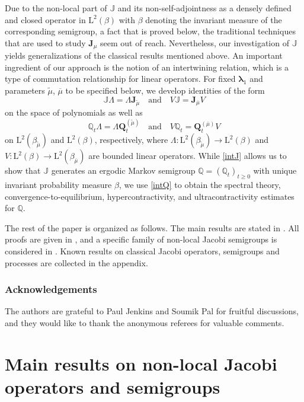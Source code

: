 \documentclass[10pt]{amsart}
\theoremstyle{plain}
\theoremstyle{definition}
\newcommand{\J}{\mathds{Q}}
\newcommand{\calJ}{\mathds{J}}
\newcommand{\Leb}{\mathrm{L}}
\newcommand{\calJd}{\mathbf{J}}
\newcommand{\lam}{{\bm{\lambda}_1}}
\newcommand{\Q}[1][\mo]{\mathbf{Q}^{({#1})}}
\newcommand{\gab}[1][\lam,\mo]{{\beta_{#1}}}
\let\mo\mu
\let\bpsi\beta
\begin{document}
Due to the non-local part of $\calJ$ and its non-self-adjointness as a densely defined and closed operator in $\Leb^2(\bpsi)$ with $\bpsi$ denoting the invariant measure of the corresponding semigroup, a fact that is proved below, the traditional techniques that are used to study $\calJd_\mo$ seem out of reach. Nevertheless, our investigation of $\calJ$ yields generalizations of the
classical results mentioned above. An important ingredient of our approach is the notion of an intertwining relation, which is a type of commutation relationship for linear operators. For fixed $\lam$ and parameters $\widetilde{\mo}$, $\overline{\mo}$ to be specified below, we develop identities of the form
\begin{equation} \label{intJ}
\calJ \Lambda = \Lambda \calJd_{\widetilde{\mo}} \quad \mbox{and} \quad V \calJ = \calJd_{\overline{\mo}} V
\end{equation}
on the space of polynomials as well as
\begin{equation} \label{intQ}
\J_t \Lambda = \Lambda \Q[\widetilde{\mo}]_t \quad \mbox{and} \quad V\J_t = \Q[\overline{\mo}]_t V
\end{equation}
on $\Leb^2(\gab[\widetilde{\mo}])$ and $\Leb^2(\bpsi)$, respectively, where $\Lambda:\Leb^2(\gab[\widetilde{\mo}]) \to \Leb^2(\bpsi)$ and $V:\Leb^2(\bpsi) \to \Leb^2(\gab[\overline{\mo}])$ are bounded linear operators.
While \eqref{intJ} allows us to show that $\calJ$ generates an ergodic Markov semigroup $\J = (\J_t)_{t \geq 0}$
with unique invariant probability measure $\bpsi$, we use \eqref{intQ} to obtain
the spectral theory, convergence-to-equilibrium, hypercontractivity, and ultracontractivity estimates for $\J$.

The rest of the paper is organized as follows. The main results are stated in . All proofs are given in , and a specific family of non-local Jacobi semigroups is considered in .
Known results on classical Jacobi operators, semigroups and processes are collected in the appendix.

\subsubsection*{Acknowledgements}
The authors are grateful to Paul Jenkins and Soumik Pal for fruitful discussions, and they would like to thank the anonymous referees for valuable comments.

\section{Main results on non-local Jacobi operators and semigroups} \label{sec:main-results}
\end{document}
